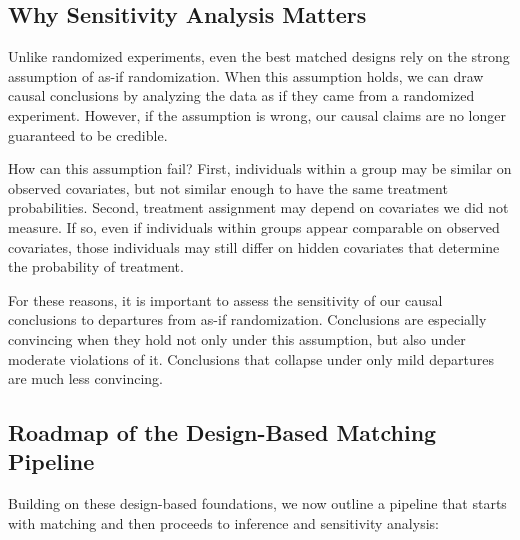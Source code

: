 \documentclass[
  12pt,
  leqno]{article}
\begin{document}
\subsection{Why Sensitivity Analysis
Matters}\label{why-sensitivity-analysis-matters}

Unlike randomized experiments, even the best matched designs rely on the
strong assumption of as-if randomization. When this assumption holds, we
can draw causal conclusions by analyzing the data as if they came from a
randomized experiment. However, if the assumption is wrong, our causal
claims are no longer guaranteed to be credible.

How can this assumption fail? First, individuals within a group may be
similar on observed covariates, but not similar enough to have the same
treatment probabilities. Second, treatment assignment may depend on
covariates we did not measure. If so, even if individuals within groups
appear comparable on observed covariates, those individuals may still
differ on hidden covariates that determine the probability of treatment.

For these reasons, it is important to assess the sensitivity of our
causal conclusions to departures from as-if randomization. Conclusions
are especially convincing when they hold not only under this assumption,
but also under moderate violations of it. Conclusions that collapse
under only mild departures are much less convincing.

\subsection{Roadmap of the Design-Based Matching
Pipeline}\label{roadmap-of-the-design-based-matching-pipeline}

Building on these design-based foundations, we now outline a pipeline
that starts with matching and then proceeds to inference and sensitivity
analysis:
\end{document}
